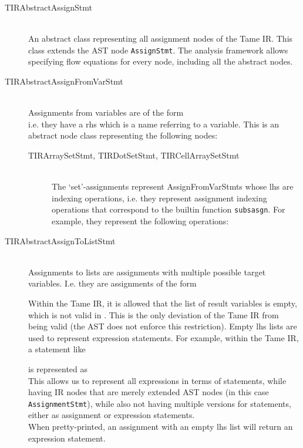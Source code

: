 \begin{description}
\item[TIRAbstractAssignStmt] \hfill \\
An abstract class representing all assignment nodes of the Tame IR. This class
extends the AST node {\tt AssignStmt}. The analysis framework allows
specifying flow equations for every node, including all the abstract nodes.

\vspace{.5cm}
\item[TIRAbstractAssignFromVarStmt] \hfill \\
Assignments from variables are of the form
\\
i.e. they have a rhs which is a name referring to a variable.
This is an abstract node class representing the following nodes:

\begin{description}
\item[TIRArraySetStmt, TIRDotSetStmt, TIRCellArraySetStmt] \hfill \\
The `set'-assignments represent AssignFromVarStmts whose lhs are indexing operations, i.e.
they represent assignment indexing operations that correspond to the \matlab builtin
function {\tt subsasgn}. For example, they represent the following operations:
\end{description}


\vspace{.5cm}
\item[TIRAbstractAssignToListStmt] \hfill \\
Assignments to lists are assignments with multiple possible
target variables. I.e. they are assignments of the form

Within the Tame IR, it is allowed that the list of result variables
is empty, which is not valid in \matlab. This is the only deviation
of the Tame IR from being valid \matlab (the AST does not enforce
this restriction). Empty lhs lists are used
to represent expression statements. For example, within the Tame
IR, a statement like

is represented as
\\
This allows us to represent all expressions in terms
of statements, while having IR nodes that are merely extended
AST nodes (in this case {\tt AssignmentStmt}),
while also not having multiple versions for statements, either
as assignment or expression statements.\\
When pretty-printed, an assignment with an empty lhs list will
return an expression statement.\\


\end{description}
